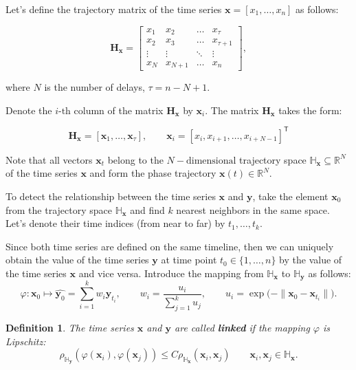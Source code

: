 \documentclass[bst/sn-mathphys]{sn-jnl}%
\newcommand{\bx}{\ensuremath{\mathbf{x}}}
\newcommand{\by}{\mathbf{y}}
\newcommand{\bH}{\mathbf{H}}
\newcommand{\dH}{\mathbb{H}}
\newcommand{\dR}{\mathbb{R}}
\renewcommand{\T}{^{\mathsf{T}}}
\theoremstyle{thmstyleone}%
\theoremstyle{thmstyletwo}%
\theoremstyle{thmstylethree}%
\newtheorem{definition}{Definition}%
\begin{document}
Let's define the trajectory matrix of the time series $\bx = [x_1, \ldots, x_n]$ as follows:

\begin{equation*} \label{eq:traj_mat}
	\bH_{\bx} = \begin{bmatrix}
		x_1 & x_2 & \ldots & x_{\tau} \\
		x_2 & x_3 & \ldots & x_{\tau+1} \\
		\vdots & \vdots & \ddots & \vdots \\
		x_{N} & x_{N+1} & \ldots & x_n
	\end{bmatrix}, 
\end{equation*} 

where $N$ is the number of delays, $\tau = n - N + 1$.

Denote the $i\text{-th}$ column of the matrix $\bH_{\bx}$ by $\bx_i$.
The matrix $\bH_{\bx}$ takes the form:

\begin{equation*}\label{eq:traj_mat_short}
	\bH_{\bx} = [\bx_1, \ldots, \bx_{\tau}], \qquad \bx_i = [x_i, x_{i+1}, \ldots, x_{i+N-1}] \T
\end{equation*}

Note that all vectors $\bx_t$ belong to the $N-\text{dimensional}$ trajectory space $\dH_{\bx} \subseteq \dR^N$ of the time series $\bx$ and form the phase trajectory $\bx(t) \in \dR^N$.

To detect the relationship between the time series $\bx$ and $\by$, take the element $\bx_0$ from the trajectory space $\dH_{\bx}$ and find $k$ nearest neighbors in the same space. 
Let's denote their time indices (from near to far) by $t_1, \ldots, t_k$.

Since both time series are defined on the same timeline, then we can uniquely obtain the value of the time series $\by$ at time point $t_0 \in \{1, \ldots, n\}$ by the value of the time series $\bx$ and vice versa.
Introduce the mapping from $\dH_{\bx}$ to $\dH_{\by}$ as follows:
$$ \varphi: \bx_0 \mapsto \widehat{\by_0} = \sum\limits_{i=1}^k w_i \by_{t_i}, \qquad 
w_i = \dfrac{u_i}{\sum\limits_{j=1}^k u_j}, \qquad
u_i = \exp \bigl( - \| \bx_0 - \bx_{t_i} \| \bigr).$$

\begin{definition}
	The time series $\bx$ and $\by$ are called \textbf{linked} if the mapping $\varphi$ is Lipschitz:
	$$\rho_{\dH_{\by}}(\varphi(\bx_i), \varphi(\bx_j)) \leq C \rho_{\dH_{\bx}}(\bx_i, \bx_j) \qquad \bx_i, \bx_j \in \dH_{\bx}. $$
\end{definition}
\end{document}
